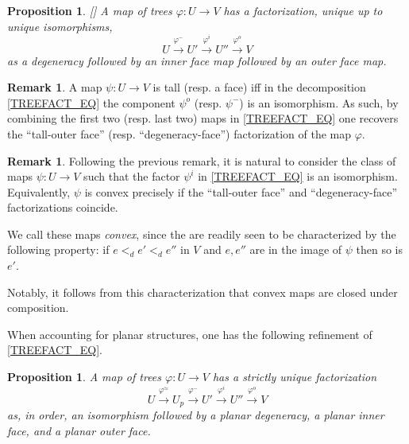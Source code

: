 \documentclass[a4paper,10pt
,draft
]{article}%
\numberwithin{equation}{section}
\numberwithin{figure}{section}
\newtheorem{proposition}[equation]{Proposition}%
\theoremstyle{definition} %
\newtheorem{remark}[equation]{Remark}%
\newcommand{\1}{\ensuremath{\mathbbm 1}}%
\begin{document}
\begin{proposition}\label{TREEFACT_PROP}
	[{\cite[Prop. 2.2]{BP_edss}}]
	A map of trees $\varphi \colon U \to V$ has a factorization, unique up to unique isomorphisms,
\begin{equation}\label{TREEFACT_EQ}
	U \xrightarrow{\varphi^-} 
	U' \xrightarrow{\varphi^i} 
	U'' \xrightarrow{\varphi^o} V
\end{equation}
	as a degeneracy followed by an inner face map followed by an outer face map.
\end{proposition}


\begin{remark}\label{TODF REM}
	A map $\psi \colon U \to V$
	is tall (resp. a face)
	iff in the decomposition \eqref{TREEFACT_EQ}
	the component $\psi^o$ (resp. $\psi^-$)
	is an isomorphism.
	As such, by combining the 
	first two (resp. last two)
	maps in \eqref{TREEFACT_EQ}
	one recovers the 
	``tall-outer face'' 
	(resp. ``degeneracy-face'')
	factorization of the map $\varphi$.
\end{remark}


\begin{remark}\label{CNVXM REM}
	Following the previous remark, 
	it is natural to consider the class of maps
	$\psi \colon U \to V$ such that
	the factor $\psi^i$ in \eqref{TREEFACT_EQ}
	is an isomorphism.
	Equivalently, $\psi$ is convex precisely if
	the ``tall-outer face'' and ``degeneracy-face''
	factorizations coincide.
	
	We call these maps \textit{convex},
	since the are readily seen to be 
	characterized by the following property:
	if $e <_d e' <_d e''$
	in $V$ and $e,e''$ are in the image of $\psi$
	then so is $e'$.
	
	Notably, it follows from this characterization that convex maps are closed under composition.
\end{remark}


When accounting for planar structures,
one has the following refinement of \eqref{TREEFACT_EQ}.

\begin{proposition}
      A map of trees $\varphi \colon U \to V$ has a strictly unique factorization
      \begin{equation}
            \label{OMEGAFACT_EQ}
            U \xrightarrow{\varphi^{\simeq}} U_p \xrightarrow{\varphi^-} U' \xrightarrow{\varphi^i} U'' \xrightarrow{\varphi^o} V            
      \end{equation}
      as, in order, an isomorphism followed by
      a planar degeneracy, a planar inner face, and a planar outer face.
\end{proposition}
\end{document}
